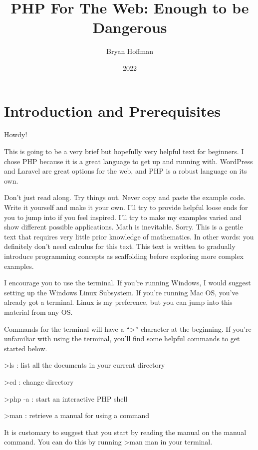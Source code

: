 \documentclass[
]{book}
\title{PHP For The Web: Enough to be Dangerous}
\author{Bryan Hoffman}
\date{2022}
\begin{document}
\maketitle

{
\setcounter{tocdepth}{1}
\tableofcontents
}
\hypertarget{introduction-and-prerequisites}{%
\chapter{Introduction and Prerequisites}\label{introduction-and-prerequisites}}

Howdy!

This is going to be a very brief but hopefully very helpful text for beginners. I chose PHP because it is a great language to get up and running with. WordPress and Laravel are great options for the web, and PHP is a robust language on its own.

Don't just read along. Try things out. Never copy and paste the example code. Write it yourself and make it your own. I'll try to provide helpful loose ends for you to jump into if you feel inspired. I'll try to make my examples varied and show different possible applications. Math is inevitable. Sorry. This is a gentle text that requires very little prior knowledge of mathematics. In other words: you definitely don't need calculus for this text. This text is written to gradually introduce programming concepts as scaffolding before exploring more complex examples.

I encourage you to use the terminal. If you're running Windows, I would suggest setting up the Windows Linux Subsystem. If you're running Mac OS, you've already got a terminal. Linux is my preference, but you can jump into this material from any OS.

Commands for the terminal will have a ``\textgreater{}'' character at the beginning. If you're unfamiliar with using the terminal, you'll find some helpful commands to get started below.

\textgreater ls : list all the documents in your current directory

\textgreater cd : change directory

\textgreater php -a : start an interactive PHP shell

\textgreater man : retrieve a manual for using a command

It is customary to suggest that you start by reading the manual on the manual command. You can do this by running \textgreater man man in your terminal.
\end{document}

